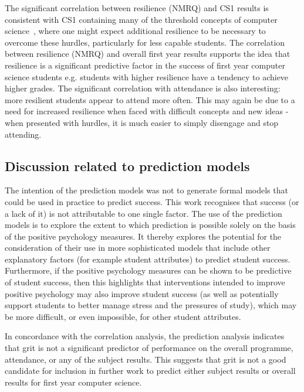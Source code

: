 \documentclass[sigconf]{acmart}
\begin{document}
The significant correlation between resilience (NMRQ) and CS1 results is consistent with CS1 containing many of the threshold concepts of computer science~\cite{Sanders:2016:TCC:2999541.2999546}, where one might expect additional resilience to be necessary to overcome these hurdles, particularly for less capable students.  The correlation between resilience (NMRQ) and overall first year results supports the idea that resilience is a significant predictive factor in the success of first year computer science students e.g. students with higher resilience have a tendency to achieve higher grades. The significant correlation with attendance is also interesting: more resilient students appear to attend more often. This may again be due to a need for increased resilience when faced with difficult concepts and new ideas - when presented with hurdles, it is much easier to simply disengage and stop attending.
 
\subsection {Discussion related to prediction models}
The intention of the prediction models was not to generate formal models that could be used in practice to predict success. This work recognises that success (or a lack of it) is not attributable to one single factor. The use of the prediction models is to explore the extent to which prediction is possible solely on the basis of the positive psychology measures.  It thereby explores the potential for the consideration of their use in more sophisticated models that include other explanatory factors (for example student attributes) to predict student success. Furthermore, if the positive psychology measures can be shown to be predictive of student success, then this highlights that interventions intended to improve positive psychology may also improve student success (as well as potentially support students to better manage stress and the pressures of study), which may be more difficult, or even impossible, for other student attributes.

In concordance with the correlation analysis, the prediction analysis indicates that grit is not a significant predictor of performance on the overall programme, attendance, or any of the subject results. This suggests that grit is not a good candidate for inclusion in further work to predict either subject results or overall results for first year computer science. 
\end{document}
